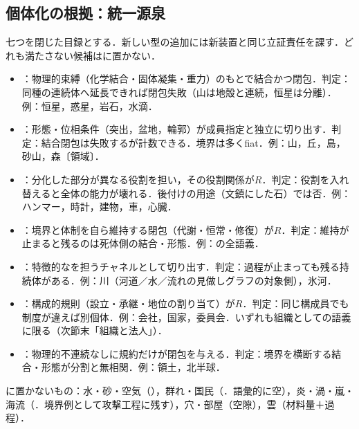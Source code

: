 \documentclass[../../main-detail.tex]{subfiles}
\begin{document}
\subsection{個体化の根拠：統一源泉}
七つを閉じた目録とする．新しい型の追加には新装置と同じ立証責任を課す．どれも満たさない候補はに置かない．
\begin{itemize}
  \item {}：物理的束縛（化学結合・固体凝集・重力）のもとで結合かつ閉包．判定：同種の連続体へ延長できれば閉包失敗（山は地殻と連続，恒星は分離）．例：恒星，惑星，岩石，水滴．
  \item {}：形態・位相条件（突出，盆地，輪郭）が成員指定と独立に切り出す．判定：結合閉包は失敗するが計数できる．境界は多くfiat．例：山，丘，島，砂山，森〔領域〕．
  \item {}：分化した部分が異なる役割を担い，その役割関係が$R$．判定：役割を入れ替えると全体の能力が壊れる．後付けの用途（文鎮にした石）では否．例：ハンマー，時計，建物，車，心臓．
  \item {}：境界と体制を自ら維持する閉包（代謝・恒常・修復）が$R$．判定：維持が止まると残るのは死体側の結合・形態．例：の全語義．
  \item {}：特徴的なを担うチャネルとして切り出す．判定：過程が止まっても残る持続体がある．例：川（河道／水／流れの見做しグラフの対象側），氷河．
  \item {}：構成的規則（設立・承継・地位の割り当て）が$R$．判定：同じ構成員でも制度が違えば別個体．例：会社，国家，委員会．いずれも組織としての語義に限る（次節末「組織と法人」）．
  \item {}：物理的不連続なしに規約だけが閉包を与える．判定：境界を横断する結合・形態が分割と無相関．例：領土，北半球．
\end{itemize}
に置かないもの：水・砂・空気（），群れ・国民（．語彙的に空），炎・渦・嵐・海流（．境界例として攻撃工程に残す），穴・部屋（空隙），雲（材料量＋過程）．
\end{document}
